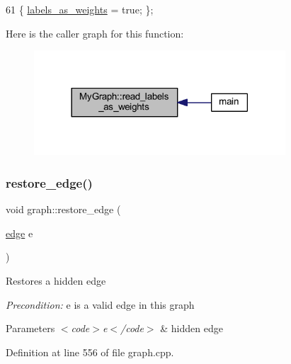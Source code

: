 \begin{DoxyCode}
61 \{ \mbox{\hyperlink{class_my_graph_a1c451264db5a154029533d9368b90317}{labels\_as\_weights}} = \textcolor{keyword}{true}; \};
\end{DoxyCode}
Here is the caller graph for this function\+:
\nopagebreak
\begin{figure}[H]
\begin{center}
\leavevmode
\includegraphics[width=266pt]{class_my_graph_a5d90ef0fba45bbbdf53a3bfe6f9a7061_icgraph}
\end{center}
\end{figure}
\mbox{\label{classgraph_a2e5426682a0897b9f9104b019970bedc}} 
\subsubsection{\texorpdfstring{restore\+\_\+edge()}{restore\_edge()}}
{\footnotesize\ttfamily void graph\+::restore\+\_\+edge (\begin{DoxyParamCaption}\item[{\mbox{\hyperlink{classedge}{edge}}}]{e }\end{DoxyParamCaption})\hspace{0.3cm}{\ttfamily [inherited]}}

Restores a hidden edge

{\itshape Precondition\+:} {\ttfamily e} is a valid edge in this graph


\begin{DoxyParams}{Parameters}
{\em $<$code$>$e$<$/code$>$} & hidden edge \\
\hline
\end{DoxyParams}


Definition at line 556 of file graph.\+cpp.


